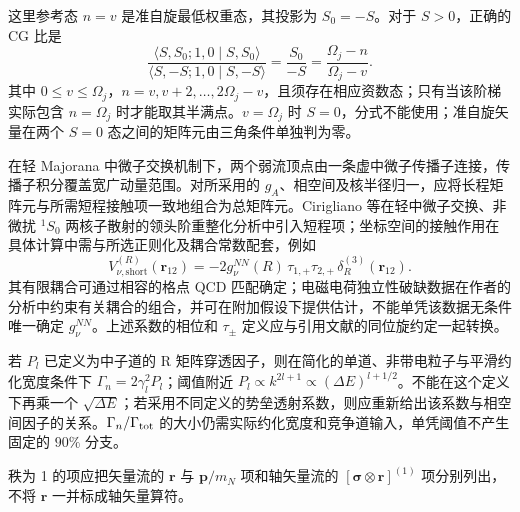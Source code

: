 这里参考态 $n=v$ 是准自旋最低权重态，其投影为 $S_0=-S$。对于 $S>0$，正确的 CG 比是
\[
\frac{\langle S,S_0;1,0\mid S,S_0\rangle}
     {\langle S,-S;1,0\mid S,-S\rangle}
=\frac{S_0}{-S}=\frac{\Omega_j-n}{\Omega_j-v}.
\]
其中 $0\le v\le\Omega_j$，$n=v,v+2,\ldots,2\Omega_j-v$，且须存在相应资数态；只有当该阶梯实际包含 $n=\Omega_j$ 时才能取其半满点。$v=\Omega_j$ 时 $S=0$，分式不能使用；准自旋矢量在两个 $S=0$ 态之间的矩阵元由三角条件单独判为零。

在轻 Majorana 中微子交换机制下，两个弱流顶点由一条虚中微子传播子连接，传播子积分覆盖宽广动量范围。对所采用的 $g_A$、相空间及核半径归一，应将长程矩阵元与所需短程接触项一致地组合为总矩阵元。Cirigliano 等在轻中微子交换、非微扰 $^1S_0$ 两核子散射的领头阶重整化分析中引入短程项；坐标空间的接触作用在具体计算中需与所选正则化及耦合常数配套，例如
\[
V_{\nu,\mathrm{short}}^{(R)}(\mathbf r_{12})
=-2g_\nu^{NN}(R)\,\tau_{1,+}\tau_{2,+}\,\delta_R^{(3)}(\mathbf r_{12}).
\]
其有限耦合可通过相容的格点 QCD 匹配确定；电磁电荷独立性破缺数据在作者的分析中约束有关耦合的组合，并可在附加假设下提供估计，不能单凭该数据无条件唯一确定 $g_\nu^{NN}$。上述系数的相位和 $\tau_\pm$ 定义应与引用文献的同位旋约定一起转换。

若 $P_l$ 已定义为中子道的 R 矩阵穿透因子，则在简化的单道、非带电粒子与平滑约化宽度条件下 $\Gamma_n=2\gamma_l^2P_l$；阈值附近 $P_l\propto k^{2l+1}\propto(\Delta E)^{l+1/2}$。不能在这个定义下再乘一个 $\sqrt{\Delta E}$；若采用不同定义的势垒透射系数，则应重新给出该系数与相空间因子的关系。$\Gamma_n/\Gamma_{\rm tot}$ 的大小仍需实际约化宽度和竞争道输入，单凭阈值不产生固定的 $90\%$ 分支。

秩为 1 的项应把矢量流的 $\mathbf r$ 与 $\mathbf p/m_N$ 项和轴矢量流的 $[\boldsymbol\sigma\otimes\mathbf r]^{(1)}$ 项分别列出，不将 $\mathbf r$ 一并标成轴矢量算符。
